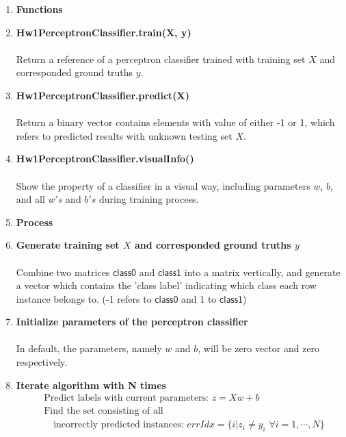\documentclass[12pt]{article}
\makeatletter
\renewenvironment{itemize}
{\list{$\bullet$}{\leftmargin\z@ \labelwidth\z@ \itemindent-\leftmargin
\let\makelabel\descriptionlabel}}
{\endlist}
\makeatother
\begin{document}
\begin{enumerate}
	\item {\bf Functions}
	\begin{itemize}
		\item {\bf Hw1PerceptronClassifier.train(X, y)} \\ \\
			Return a reference of a perceptron classifier trained with training set $X$ and corresponded ground truths $y$. \\
		\item {\bf Hw1PerceptronClassifier.predict(X)} \\ \\
			Return a binary vector contains elements with value of either -1 or 1, which refers to predicted results with unknown testing set $X$. \\
		\item {\bf Hw1PerceptronClassifier.visualInfo()} \\ \\
			Show the property of a classifier in a visual way, including parameters $w$, $b$, and all $w's$ and $b's$ during training process.
	\end{itemize}
	\newpage
	\item {\bf Process}
	\begin{itemize}
		\item {\bf Generate training set $X$ and corresponded ground truths $y$} \\ \\
			Combine two matrices $\mathsf{class0}$ and $\mathsf{class1}$ into a matrix vertically, and generate a vector which contains the 
			'class label' indicating which class each row instance belongs to. (-1 refers to $\mathsf{class0}$ and 1 to $\mathsf{class1}$) \\
		\item {\bf Initialize parameters of the perceptron classifier} \\ \\
			In default, the parameters, namely $w$ and $b$, will be zero vector and zero respectively. \\
		\item {\bf Iterate algorithm with N times}
		\begin{align*}
			&\text{Predict labels with current parameters}: \, z=Xw+b \\
			&\text{Find the set consisting of all} \\
			&\quad \text{incorrectly predicted instances}: \, errIdx = \{i|z_i \neq y_i \,\, \forall i=1, \cdots, N \} \\

\end{align*}
\end{itemize}
\end{enumerate}
\end{document}
